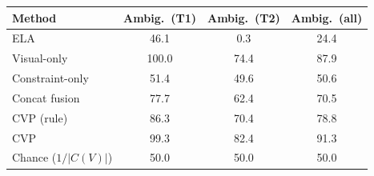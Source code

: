 \begin{tabular}{lccc}
\toprule
Method & Ambig.\ (T1) & Ambig.\ (T2) & Ambig.\ (all)\\
\midrule
ELA & 46.1 & 0.3 & 24.4\\
Visual-only & 100.0 & 74.4 & 87.9\\
Constraint-only & 51.4 & 49.6 & 50.6\\
Concat fusion & 77.7 & 62.4 & 70.5\\
CVP (rule) & 86.3 & 70.4 & 78.8\\
CVP & 99.3 & 82.4 & 91.3\\
\midrule
Chance ($1/|C(V)|$) & 50.0 & 50.0 & 50.0\\
\bottomrule
\end{tabular}
